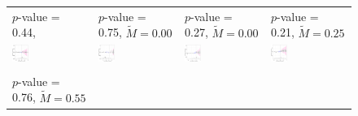 \documentclass[12pt]{article}
\begin{document}
\begin{figure}[!h]
{\begin{tabular}{C{3.8cm}C{3.8cm}C{3.8cm}C{3.8cm}}
   \citet{Caughey2017} \newline $p$-value =  0.44,  &  
   \citet{Christensen2021}  \newline $p$-value =  0.75, $\tilde{M} = 0.00$ & 
   \citet{Clarke2020}  \newline $p$-value =  0.27, $\tilde{M} = 0.00$ &
   \citet{Clayton2018} \newline  $p$-value = 0.21, $\tilde{M} = 0.25$  \\
   \hspace{-2em} \includegraphics[width = 0.22\textwidth]{figure/placebo_honest/Caughey_honest_placebo}  &
   \hspace{-2em} \includegraphics[width = 0.22\textwidth]{figure/placebo_honest/chris_sub_honest_placebo}  & 
   \hspace{-2em}  \includegraphics[width = 0.22\textwidth]{figure/placebo_honest/Clark_honest_placebo} &
   \hspace{-2em}\includegraphics[width = 0.22\textwidth]{figure/placebo_honest/clayton_honest_placebo.png} \\ \\ 
   \citet{cox2021budgetary} \newline  $p$-value = 0.76, $\tilde{M} = 0.55$ &

\end{tabular}}
\end{figure}
\end{document}
